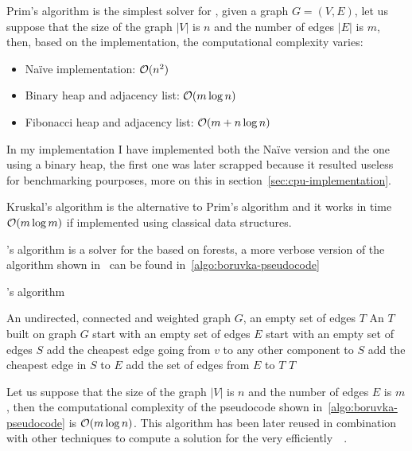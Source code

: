 \documentclass[a4paper,10pt]{article}
\begin{document}
Prim's algorithm is the simplest solver for \mstp, given a graph $G= (V, E)$, let us suppose that the size of the graph $|V|$ is $n$ and the number of edges $|E|$ is $m$, then, based on the implementation, the computational complexity varies:
\begin{itemize}
	\item Na\"ive implementation: $\mathcal{O}(n^2)$
	\item Binary heap and adjacency list: $\mathcal{O}(m\log{n})$
	\item Fibonacci heap and adjacency list: $\mathcal{O}(m + n\log{n})$
\end{itemize}
In my implementation I have implemented both the Na\"ive version and the one using a binary heap, the first one was later scrapped because it resulted useless for benchmarking pourposes, more on this in section~\ref{sec:cpu-implementation}.

Kruskal's algorithm is the alternative to Prim's algorithm and it works in time $\mathcal{O}(m\log{m})$ if implemented using classical data structures.

\brka's algorithm is a solver for the \mstp based on forests, a more verbose version of the algorithm shown in~\cite{boruvka-pseudocode} can be found in~\ref{algo:boruvka-pseudocode}
\begin{algorithm}
	\caption{\brka's algorithm}
	\label{algo:boruvka-pseudocode}
	\begin{algorithmic}[1]
		\REQUIRE An undirected, connected and weighted graph $G$, an empty set of edges $T$
		\ENSURE An \mst$T$ built on graph $G$
		\STATE start with an empty set of edges $E$
		\STATE start with an empty set of edges $S$
		\STATE add the cheapest edge going from $v$ to any other component to $S$
		\ENDFOR
		\STATE add the cheapest edge in $S$ to $E$
		\ENDFOR
		\STATE add the set of edges from $E$ to $T$
		\ENDWHILE
		\STATE\RETURN $T$
	\end{algorithmic}
\end{algorithm}

Let us suppose that the size of the graph $|V|$ is $n$ and the number of edges $E$ is $m$, then the computational complexity of the pseudocode shown in~\ref{algo:boruvka-pseudocode} is $\mathcal{O}(m\log{n})$. This algorithm has been later reused in combination with other techniques to compute a solution for the \mstp very efficiently~\cite{boruvka-ackermann}~\cite{karger-klein-tarjan}.
\end{document}
